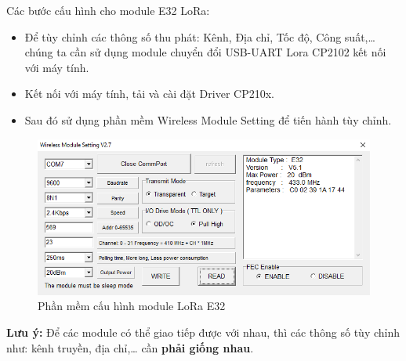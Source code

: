 \indent Các bước cấu hình cho module E32 LoRa:
\begin{itemize}
	\item Để tùy chỉnh các thông số thu phát: Kênh, Địa chỉ, Tốc độ, Công suất,… chúng ta cần sử dụng module chuyển đổi USB-UART Lora CP2102 kết nối với máy tính.
	\item Kết nối với máy tính, tải và cài đặt Driver CP210x.
	\item Sau đó sử dụng phần mềm Wireless Module Setting để tiến hành tùy chỉnh.
\end{itemize}
\begin{figure}[H]
	\centering
	\includegraphics[scale=.5]{Chapter 2/image chapter 2/configLoRa.png}
	\caption[Phần mềm cấu hình module LoRa E32]{Phần mềm cấu hình module LoRa E32}
\end{figure}

\indent \textbf{Lưu ý:} Để các module có thể giao tiếp được với nhau, thì các thông số tùy chỉnh như: kênh truyền, địa chỉ,… cần \textbf{phải giống nhau}.
